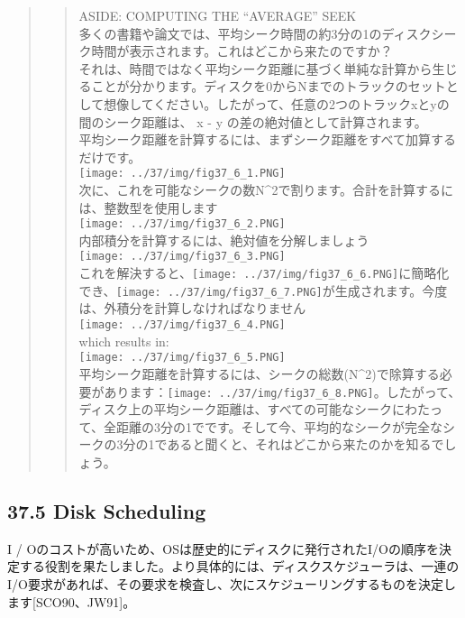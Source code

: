 \begin{quote}
\begin{quote}
ASIDE: COMPUTING THE ``AVERAGE'' SEEK\\
多くの書籍や論文では、平均シーク時間の約3分の1のディスクシーク時間が表示されます。これはどこから来たのですか？\\
それは、時間ではなく平均シーク距離に基づく単純な計算から生じることが分かります。ディスクを0からNまでのトラックのセットとして想像してください。したがって、任意の2つのトラックxとyの間のシーク距離は、\textbar{}
x - y \textbar の差の絶対値として計算されます。\\
平均シーク距離を計算するには、まずシーク距離をすべて加算するだけです。\\
\texttt{[image: ../37/img/fig37\_6\_1.PNG]}\\
次に、これを可能なシークの数N\^{}2で割ります。合計を計算するには、整数型を使用します\\
\texttt{[image: ../37/img/fig37\_6\_2.PNG]}\\
内部積分を計算するには、絶対値を分解しましょう\\
\texttt{[image: ../37/img/fig37\_6\_3.PNG]}\\
これを解決すると、\texttt{[image: ../37/img/fig37\_6\_6.PNG]}に簡略化でき、\texttt{[image: ../37/img/fig37\_6\_7.PNG]}が生成されます。今度は、外積分を計算しなければなりません\\
\texttt{[image: ../37/img/fig37\_6\_4.PNG]}\\
which results in:\\
\texttt{[image: ../37/img/fig37\_6\_5.PNG]}\\
平均シーク距離を計算するには、シークの総数(N\^{}2)で除算する必要があります：\texttt{[image: ../37/img/fig37\_6\_8.PNG]}。したがって、ディスク上の平均シーク距離は、すべての可能なシークにわたって、全距離の3分の1でです。そして今、平均的なシークが完全なシークの3分の1であると聞くと、それはどこから来たのかを知るでしょう。
\end{quote}
\end{quote}

\hypertarget{disk-scheduling}{%
\subsection*{37.5 Disk Scheduling}\label{disk-scheduling}}

I /
Oのコストが高いため、OSは歴史的にディスクに発行されたI/Oの順序を決定する役割を果たしました。より具体的には、ディスクスケジューラは、一連のI/O要求があれば、その要求を検査し、次にスケジューリングするものを決定します{[}SCO90、JW91{]}。

